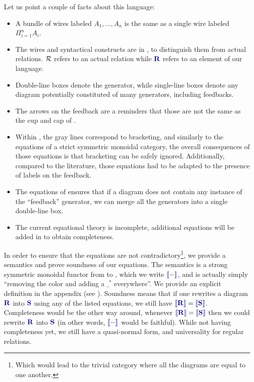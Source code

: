 Let us point a couple of facts about this language:
\begin{itemize}
	\item A bundle of wires labeled $A_1,\dots,A_n$ is the same as a single wire labeled $\Pi_{i=1}^n A_i$.
	\item The wires and syntactical constructs are in , to distinguish them from actual relations. ${\mathcal{R}}$ refers to an actual relation while $\bR$ refers to an element of our language.
	\item Double-line boxes denote the generator, while single-line boxes denote any diagram potentially constituted of many generators, including feedbacks.
	\item The arrows on the feedback are a reminders that those are not the same as the cup and cap of .
	\item Within , the gray lines correspond to bracketing, and similarly to the equations of a strict symmetric monoidal category, the overall consequences of those equations is that bracketing can be safely ignored. Additionally, compared to the literature, those equations had to be adapted to the presence of labels on the feedback.
	\item The equations of  ensures that if a diagram does not contain any instance of the ``feedback'' generator, we can merge all the generators into a single double-line box.
	\item The current equational theory is incomplete, additional equations will be added in  to obtain completeness.
\end{itemize}

In order to ensure that the equations are not contradictory\footnote{Which would lead to the trivial category where all the diagrams are equal to one another.}, we provide a semantics and prove soundness of our equations. The semantics is a strong symmetric monoidal functor from  to , which we write $\binterp{-}$, and is actually simply ``removing the color and adding a $\_^*$ everywhere''. We provide an explicit definition in the appendix (see ). Soundness means that if one rewrites a diagram $\bR$ into $\bS$ using any of the listed equations, we still have $\binterp{\bR} = \binterp{\bS}$.
Completeness would be the other way around, whenever $\binterp{\bR} = \binterp{\bS}$ then we could rewrite $\bR$ into $\bS$ (in other words,  $\binterp{-}$ would be faithful).
While not having completeness yet, we still have a quasi-normal form, and universality for regular relations.
		
